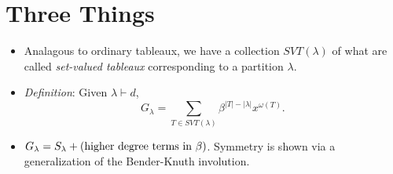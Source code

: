 \documentclass[12pt]{article}
\begin{document}
\section*{Three Things}

\begin{itemize}
  \item Analagous to ordinary tableaux, we have a collection $ SVT(\lambda) $ of what are called \textit{set-valued tableaux} corresponding to a partition $ \lambda $.
  \item \textit{Definition}: Given $ \lambda\vdash d $,
    \[
      G_{\lambda}= \sum_{T\in SVT(\lambda)} \beta^{|T|-| \lambda|} x^{\omega(T)}.
    \]
  \item $ G_{\lambda} = S_{\lambda} + (\text{higher degree terms in $ \beta $}) $. Symmetry is shown via a generalization of the Bender-Knuth involution.
\end{itemize}


\newpage
\end{document}
